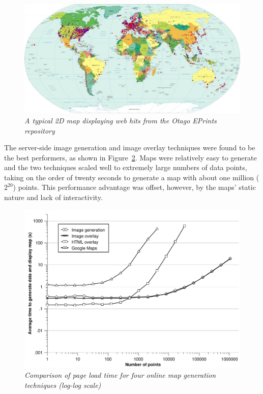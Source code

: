 \documentclass[10pt]{article}
\begin{document}
\begin{figure}
	\centering
	\includegraphics[width=\textwidth,keepaspectratio]{ImageGeneration-full}
	\caption{\textit{A typical 2D map displaying web hits from the Otago EPrints repository}}
	\label{fig-image}
\end{figure}


The server-side image generation and image overlay techniques were found to be the best performers, as shown in Figure~\ref{fig-combined-time}. Maps were relatively easy to generate and the two techniques scaled well to extremely large numbers of data points, taking on the order of twenty seconds to generate a map with about one million (\(2^{20}\)) points. This performance advantage was offset, however, by the maps' static nature and lack of interactivity.


\begin{figure}
	\centering
	\includegraphics[scale=0.55]{combined_time}
	\caption{\textit{Comparison of page load time for four online map generation techniques (log-log scale)}}
	\label{fig-combined-time}
\end{figure}
\end{document}
